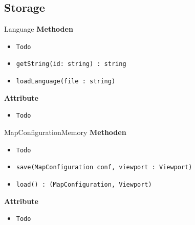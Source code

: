 \subsection{Storage}

    \begin{Class}{Language}
        \textbf{Methoden}
        \begin{itemize}
            \item \texttt{Todo}
            \item \texttt{getString(id: string) : string}
            \item \texttt{loadLanguage(file : string)}
        \end{itemize}
        
        \textbf{Attribute}
        \begin{itemize}
            \item \texttt{Todo}
        \end{itemize}
    \end{Class}

    \begin{Class}{MapConfigurationMemory}
        \textbf{Methoden}
        \begin{itemize}
            \item \texttt{Todo}
            \item \texttt{save(MapConfiguration conf, viewport : Viewport)}
            \item \texttt{load() : (MapConfiguration, Viewport)}
        \end{itemize}
        
        \textbf{Attribute}
        \begin{itemize}
            \item \texttt{Todo}
        \end{itemize}
    \end{Class}


